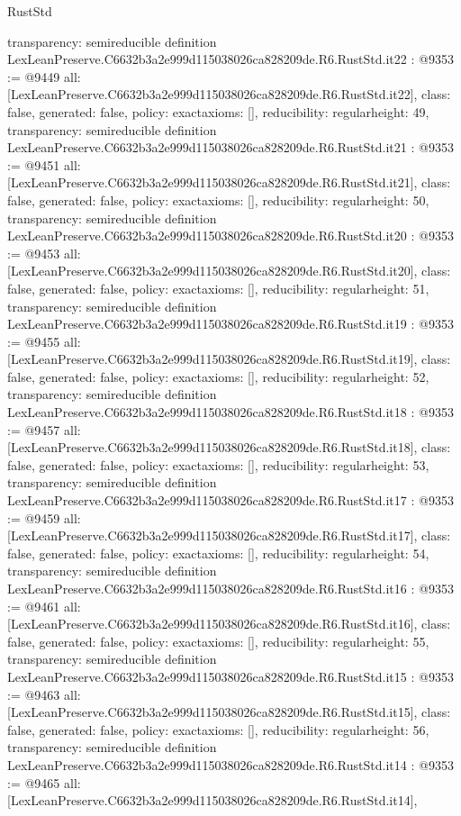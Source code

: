 \begin{lexlean}{RustStd}
\begin{coremodule}
{  transparency: semireducible
}
definition LexLeanPreserve.C6632b3a2e999d115038026ca828209de.R6.RustStd.it22 : @9353 := @9449 {
  all: [LexLeanPreserve.C6632b3a2e999d115038026ca828209de.R6.RustStd.it22],
  class: false,
  generated: false,
  policy: exact{axioms: []},
  reducibility: regular{height: 49},
  transparency: semireducible
}
definition LexLeanPreserve.C6632b3a2e999d115038026ca828209de.R6.RustStd.it21 : @9353 := @9451 {
  all: [LexLeanPreserve.C6632b3a2e999d115038026ca828209de.R6.RustStd.it21],
  class: false,
  generated: false,
  policy: exact{axioms: []},
  reducibility: regular{height: 50},
  transparency: semireducible
}
definition LexLeanPreserve.C6632b3a2e999d115038026ca828209de.R6.RustStd.it20 : @9353 := @9453 {
  all: [LexLeanPreserve.C6632b3a2e999d115038026ca828209de.R6.RustStd.it20],
  class: false,
  generated: false,
  policy: exact{axioms: []},
  reducibility: regular{height: 51},
  transparency: semireducible
}
definition LexLeanPreserve.C6632b3a2e999d115038026ca828209de.R6.RustStd.it19 : @9353 := @9455 {
  all: [LexLeanPreserve.C6632b3a2e999d115038026ca828209de.R6.RustStd.it19],
  class: false,
  generated: false,
  policy: exact{axioms: []},
  reducibility: regular{height: 52},
  transparency: semireducible
}
definition LexLeanPreserve.C6632b3a2e999d115038026ca828209de.R6.RustStd.it18 : @9353 := @9457 {
  all: [LexLeanPreserve.C6632b3a2e999d115038026ca828209de.R6.RustStd.it18],
  class: false,
  generated: false,
  policy: exact{axioms: []},
  reducibility: regular{height: 53},
  transparency: semireducible
}
definition LexLeanPreserve.C6632b3a2e999d115038026ca828209de.R6.RustStd.it17 : @9353 := @9459 {
  all: [LexLeanPreserve.C6632b3a2e999d115038026ca828209de.R6.RustStd.it17],
  class: false,
  generated: false,
  policy: exact{axioms: []},
  reducibility: regular{height: 54},
  transparency: semireducible
}
definition LexLeanPreserve.C6632b3a2e999d115038026ca828209de.R6.RustStd.it16 : @9353 := @9461 {
  all: [LexLeanPreserve.C6632b3a2e999d115038026ca828209de.R6.RustStd.it16],
  class: false,
  generated: false,
  policy: exact{axioms: []},
  reducibility: regular{height: 55},
  transparency: semireducible
}
definition LexLeanPreserve.C6632b3a2e999d115038026ca828209de.R6.RustStd.it15 : @9353 := @9463 {
  all: [LexLeanPreserve.C6632b3a2e999d115038026ca828209de.R6.RustStd.it15],
  class: false,
  generated: false,
  policy: exact{axioms: []},
  reducibility: regular{height: 56},
  transparency: semireducible
}
definition LexLeanPreserve.C6632b3a2e999d115038026ca828209de.R6.RustStd.it14 : @9353 := @9465 {
  all: [LexLeanPreserve.C6632b3a2e999d115038026ca828209de.R6.RustStd.it14],
}
\end{coremodule}
\end{lexlean}
